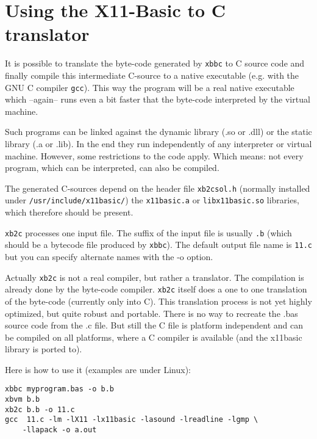 \section{Using the X11-Basic to C translator}

It is possible to translate the byte-code generated by \verb|xbbc| to C source
code and finally compile this intermediate C-source to a native executable
(e.g. with the GNU C compiler \verb|gcc|). This way the program will be a real
native executable which  --again-- runs even a bit faster  that the byte-code
interpreted by the virtual machine. 

Such programs can be linked against the dynamic library (.so or .dll) or the
static library (.a or .lib). In the end they run independently of any
interpreter or virtual machine.   However, some restrictions to the code apply.
Which means: not every program, which can be interpreted, can also be compiled.

The generated C-sources depend on the header file \verb|xb2csol.h| (normally 
installed under \verb|/usr/include/x11basic/|) the \verb|x11basic.a|  or 
\verb|libx11basic.so| libraries, which therefore should be present.  

\verb|xb2c| processes one input file. The suffix of the input file is  usually
\verb|.b| (which should be a bytecode file produced by \verb|xbbc|). The default
output file name is \verb|11.c| but you can specify alternate names with the -o
option.

Actually \verb|xb2c| is not a real compiler, but rather a translator.  The
compilation is already done by the byte-code compiler. \verb|xb2c| itself does a
one to one translation of the byte-code (currently only into C).  This
translation process is not yet highly optimized, but quite robust and portable.
There is no way to recreate the .bas source code from the .c file.  But still
the C file is platform independent and can be compiled on all platforms, where a
C compiler is available (and the x11basic library is ported to).

Here is how to use it (examples are under Linux):

\begin{mdframed}[hidealllines=true,backgroundcolor=black!20]
\begin{verbatim}
xbbc myprogram.bas -o b.b
xbvm b.b
xb2c b.b -o 11.c
gcc  11.c -lm -lX11 -lx11basic -lasound -lreadline -lgmp \
    -llapack -o a.out 
\end{verbatim}
\end{mdframed}

